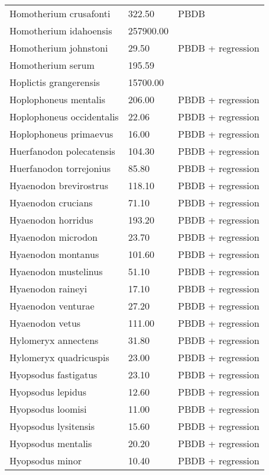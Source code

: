\begin{longtable}{p{} p{} p{}}
    Homotherium crusafonti & 322.50 & PBDB \\ 
    Homotherium idahoensis & 257900.00 & \cite{McKenna2011} \\ 
    Homotherium johnstoni & 29.50 & PBDB + regression \\ 
    Homotherium serum & 195.59 & \cite{Smith2004} \\ 
    Hoplictis grangerensis & 15700.00 & \cite{McKenna2011} \\ 
    Hoplophoneus mentalis & 206.00 & PBDB + regression \\ 
    Hoplophoneus occidentalis & 22.06 & PBDB + regression \\ 
    Hoplophoneus primaevus & 16.00 & PBDB + regression \\ 
    Huerfanodon polecatensis & 104.30 & PBDB + regression \\ 
    Huerfanodon torrejonius & 85.80 & PBDB + regression \\ 
    Hyaenodon brevirostrus & 118.10 & PBDB + regression \\ 
    Hyaenodon crucians & 71.10 & PBDB + regression \\ 
    Hyaenodon horridus & 193.20 & PBDB + regression \\ 
    Hyaenodon microdon & 23.70 & PBDB + regression \\ 
    Hyaenodon montanus & 101.60 & PBDB + regression \\ 
    Hyaenodon mustelinus & 51.10 & PBDB + regression \\ 
    Hyaenodon raineyi & 17.10 & PBDB + regression \\ 
    Hyaenodon venturae & 27.20 & PBDB + regression \\ 
    Hyaenodon vetus & 111.00 & PBDB + regression \\ 
    Hylomeryx annectens & 31.80 & PBDB + regression \\ 
    Hylomeryx quadricuspis & 23.00 & PBDB + regression \\ 
    Hyopsodus fastigatus & 23.10 & PBDB + regression \\ 
    Hyopsodus lepidus & 12.60 & PBDB + regression \\ 
    Hyopsodus loomisi & 11.00 & PBDB + regression \\ 
    Hyopsodus lysitensis & 15.60 & PBDB + regression \\ 
    Hyopsodus mentalis & 20.20 & PBDB + regression \\ 
    Hyopsodus minor & 10.40 & PBDB + regression \\ 

\end{longtable}
